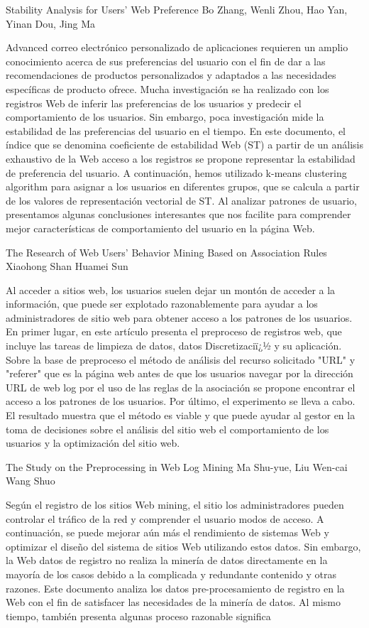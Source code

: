 Stability Analysis for Users' Web Preference
Bo Zhang, Wenli Zhou, Hao Yan, Yinan Dou, Jing Ma

Advanced correo electrónico personalizado de aplicaciones requieren un amplio conocimiento acerca de sus preferencias del usuario con el fin de dar a las recomendaciones de productos personalizados y adaptados a las necesidades específicas de producto ofrece. Mucha investigación se ha realizado con los registros Web de inferir las preferencias de los usuarios y predecir el comportamiento de los usuarios. Sin embargo, poca investigación mide la estabilidad de las preferencias del usuario en el tiempo. En este documento, el índice que se denomina coeficiente de estabilidad Web (ST) a partir de un análisis exhaustivo de la Web acceso a los registros se propone representar la estabilidad de preferencia del usuario. A continuación, hemos utilizado k-means clustering algorithm para asignar a los usuarios en diferentes grupos, que se calcula a partir de los valores de representación vectorial de ST. Al analizar patrones de usuario, presentamos algunas conclusiones interesantes que nos facilite para comprender mejor características de comportamiento del usuario en la página Web.


The Research of Web Users’ Behavior Mining Based on Association Rules
Xiaohong Shan
Huamei Sun

Al acceder a sitios web, los usuarios suelen dejar un montón de acceder a la información, que puede ser explotado razonablemente para ayudar a los administradores de sitio web para obtener acceso a los patrones de los usuarios. En primer lugar, en este artículo presenta el preproceso de registros web, que incluye las tareas de limpieza de datos, datos Discretizaciï¿½ y su aplicación. Sobre la base de preproceso el método de análisis del recurso solicitado "URL" y "referer" que es la página web antes de que los usuarios navegar por la dirección URL de web log por el uso de las reglas de la asociación se propone encontrar el acceso a los patrones de los usuarios. Por último, el experimento se lleva a cabo. El resultado muestra que el método es viable y que puede ayudar al gestor en la toma de decisiones sobre el análisis del sitio web el comportamiento de los usuarios y la optimización del sitio web.


The Study on the Preprocessing in Web Log Mining
Ma Shu-yue, Liu Wen-cai
Wang Shuo

Según el registro de los sitios Web mining, el sitio los administradores pueden controlar el tráfico de la red y comprender el usuario modos de acceso. A continuación, se puede mejorar aún más el rendimiento de sistemas Web y optimizar el diseño del sistema de sitios Web utilizando estos datos. Sin embargo, la Web datos de registro no realiza la minería de datos directamente en la mayoría de los casos debido a la complicada y redundante contenido y otras razones. Este documento analiza los datos pre-procesamiento de registro en la Web con el fin de satisfacer las necesidades de la minería de datos. Al mismo tiempo, también presenta algunas proceso razonable significa


